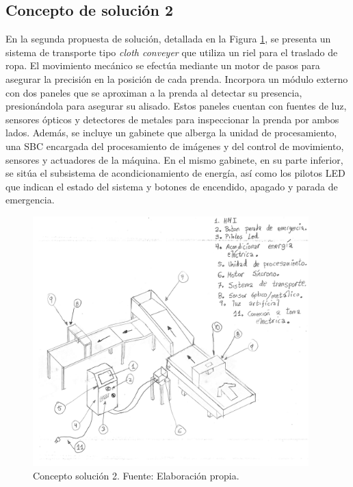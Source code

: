 \subsection{Concepto de solución 2}

En la segunda propuesta de solución, detallada en la Figura \ref{fig:sketch_CS_2}, se presenta un sistema de transporte tipo \textit{cloth conveyer} que utiliza un riel para el traslado de ropa. El movimiento mecánico se efectúa mediante un motor de pasos para asegurar la precisión en la posición de cada prenda. Incorpora un módulo externo con dos paneles que se aproximan a la prenda al detectar su presencia, presionándola para asegurar su alisado. Estos paneles cuentan con fuentes de luz, sensores ópticos y detectores de metales para inspeccionar la prenda por ambos lados. Además, se incluye un gabinete que alberga la unidad de procesamiento, una SBC encargada del procesamiento de imágenes y del control de movimiento, sensores y actuadores de la máquina. En el mismo gabinete, en su parte inferior, se sitúa el subsistema de acondicionamiento de energía, así como los pilotos LED que indican el estado del sistema y botones de encendido, apagado y parada de emergencia.

\begin{figure}[H]
	\centering
	\includegraphics[page=2,width=0.95\textwidth]{img/sketch_CS.pdf}
	\caption[Concepto solución 2.]{Concepto solución 2. Fuente: Elaboración propia.}
	\label{fig:sketch_CS_2}
\end{figure}

